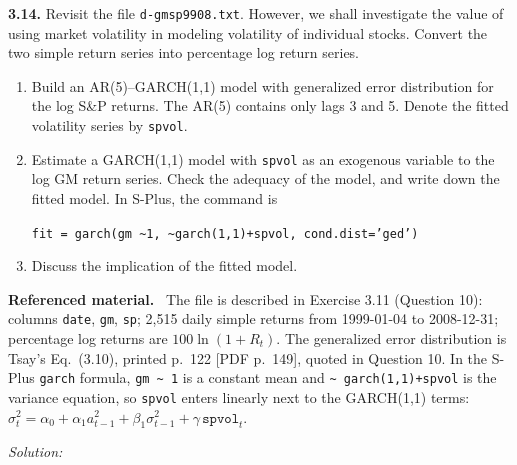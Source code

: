\documentclass[11pt,a4paper]{article}
\newif\ifsolucoes
\newcommand{\espacoresol}{4.5cm}   %
\newenvironment{refmat}{\par\smallskip\noindent\begin{minipage}{\linewidth}\small\textbf{Referenced material.}~}{\end{minipage}\par\smallskip}
\newcommand{\resolespaco}{\ifsolucoes\else\par\textit{Solution:}\vspace{\espacoresol}\par\fi}
\begin{document}
\noindent\textbf{3.14.} Revisit the file \texttt{d-gmsp9908.txt}. However, we shall investigate the value of
using market volatility in modeling volatility of individual stocks. Convert the two simple return series into
percentage log return series.
\begin{enumerate}[label=(\alph*)]
\item Build an AR(5)--GARCH(1,1) model with generalized error distribution for the log S\&P returns. The
AR(5) contains only lags 3 and 5. Denote the fitted volatility series by \texttt{spvol}.
\item Estimate a GARCH(1,1) model with \texttt{spvol} as an exogenous variable to the log GM return series.
Check the adequacy of the model, and write down the fitted model. In S-Plus, the command is
\begin{center}\texttt{fit = garch(gm \textasciitilde 1, \textasciitilde garch(1,1)+spvol, cond.dist='ged')}\end{center}
\item Discuss the implication of the fitted model.
\end{enumerate}
\begin{refmat}
The file is described in Exercise 3.11 (Question 10): columns \texttt{date}, \texttt{gm}, \texttt{sp};
2,515 daily simple returns from 1999-01-04 to 2008-12-31; percentage log returns are $100\ln(1+R_t)$. The
generalized error distribution is Tsay's Eq.~(3.10), printed p.~122 [PDF p.~149], quoted in Question 10. In
the S-Plus \texttt{garch} formula, \texttt{gm \textasciitilde{} 1} is a constant mean and
\texttt{\textasciitilde{} garch(1,1)+spvol} is the variance equation, so \texttt{spvol} enters linearly
next to the GARCH(1,1) terms: $\sigma_t^2=\alpha_0+\alpha_1a_{t-1}^2+\beta_1\sigma_{t-1}^2+\gamma\,\texttt{spvol}_t$.
\end{refmat}
\resolespaco
\end{document}
